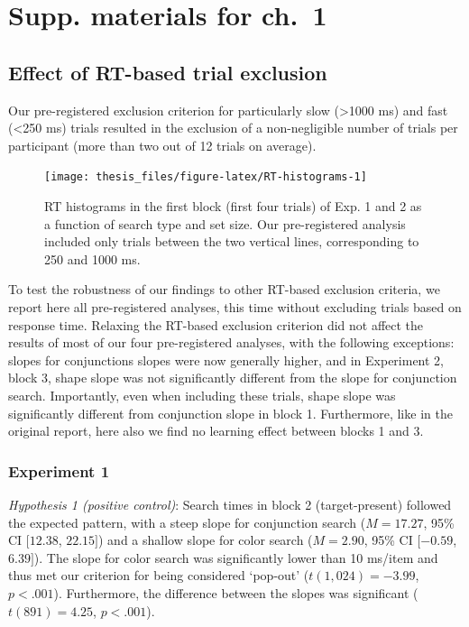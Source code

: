 \documentclass[12pt,twoside]{reedthesis}
\begin{document}
\hypertarget{app1-RT}{%
\chapter{Supp. materials for ch.~1}\label{app1-RT}}

\hypertarget{effect-of-rt-based-trial-exclusion}{%
\section{Effect of RT-based trial exclusion}\label{effect-of-rt-based-trial-exclusion}}

Our pre-registered exclusion criterion for particularly slow (\textgreater1000 ms) and fast (\textless250 ms) trials resulted in the exclusion of a non-negligible number of trials per participant (more than two out of 12 trials on average).
\begin{figure}
\texttt{[image: thesis\_files/figure-latex/RT-histograms-1]} \caption[Uncensored search time histograms]{RT histograms in the first block (first four trials) of Exp. 1 and 2 as a function of search type and set size. Our pre-registered analysis included only trials between the two vertical lines, corresponding to 250 and 1000 ms.}\label{fig:RT-histograms}
\end{figure}
To test the robustness of our findings to other RT-based exclusion criteria, we report here all pre-registered analyses, this time without excluding trials based on response time. Relaxing the RT-based exclusion criterion did not affect the results of most of our four pre-registered analyses, with the following exceptions: slopes for conjunctions slopes were now generally higher, and in Experiment 2, block 3, shape slope was not significantly different from the slope for conjunction search. Importantly, even when including these trials, shape slope was significantly different from conjunction slope in block 1. Furthermore, like in the original report, here also we find no learning effect between blocks 1 and 3.

\hypertarget{experiment-1-2}{%
\subsection{Experiment 1}\label{experiment-1-2}}

\emph{Hypothesis 1 (positive control)}: Search times in block 2 (target-present) followed the expected pattern, with a steep slope for conjunction search (\(M = 17.27\), 95\% CI \([12.38\), \(22.15]\)) and a shallow slope for color search (\(M = 2.90\), 95\% CI \([-0.59\), \(6.39]\)). The slope for color search was significantly lower than 10 ms/item and thus met our criterion for being considered `pop-out' (\(t(1,024) = -3.99\), \(p < .001\)). Furthermore, the difference between the slopes was significant (\(t(891) = 4.25\), \(p < .001\)).
\end{document}
